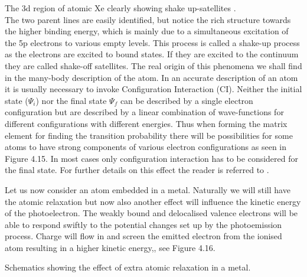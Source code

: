               The 3d region of atomic Xe
          clearly showing shake up-satellites \cite{siegbahn1}.\\


          The two parent lines are easily identified, but notice the
          rich structure towards the higher binding energy, which
          is mainly due to  a  simultaneous  excitation  of  the  5p
          electrons to various empty levels. This process is called  a
          shake-up process as  the  electrons  are  excited  to  bound
          states. If they are excited to the continuum they are called
          shake-off satellites. The real origin of this  phenomena  we
          shall find in the many-body description of the atom.  In  an
          accurate description of an atom it is  usually  necessary  to
          invoke Configuration Interaction (CI). Neither  the  initial
          state ($\Psi_{i}$) nor the final  state  $\Psi_{f}$  can  be
          described  by  a  single  electron  configuration  but  are
          described by a  linear  combination  of  wave-functions  for
          different configurations with different energies. Thus  when
          forming  the  matrix  element  for  finding  the  transition
          probability there will be possibilities for  some  atoms  to
          have strong components of various electron configurations as
          seen in  Figure  4.15.  In  most  cases  only  configuration
          interaction has to be considered for the  final  state.  For
          further details on this effect  the  reader  is  referred  to
          \cite{shirley}.

             Let us now consider an atom embedded in a metal.
          Naturally we will still have the atomic relaxation but now
          also another effect will influence the kinetic energy of
          the photoelectron. The weakly bound and delocalised valence
          electrons will be able to respond swiftly to the potential
          changes set up by the photoemission process. Charge will
          flow in and screen the emitted electron from the ionised
          atom resulting in a higher kinetic energy,, see Figure 4.16.\\

\vspace{12cm}

              Schematics showing the effect
          of extra atomic relaxation in a metal.
          \vspace{1cm}

